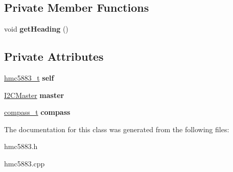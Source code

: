 \subsection*{Private Member Functions}
\begin{DoxyCompactItemize}
\item 
\mbox{\label{classHmc5883_ad4af7af089cc97b70cd75f705773e509}} 
void {\bfseries get\+Heading} ()
\end{DoxyCompactItemize}
\subsection*{Private Attributes}
\begin{DoxyCompactItemize}
\item 
\mbox{\label{classHmc5883_a7864e224789881243d69cefce89d7918}} 
\mbox{\hyperlink{structhmc5883__t}{hmc5883\+\_\+t}} {\bfseries self}
\item 
\mbox{\label{classHmc5883_a8c46d4fe172002c5020423939d2e98d1}} 
\mbox{\hyperlink{classI2CMaster}{I2\+C\+Master}} {\bfseries master}
\item 
\mbox{\label{classHmc5883_a3db3c0edeb0859b84b4530f935bc75b1}} 
\mbox{\hyperlink{structcompass__t}{compass\+\_\+t}} {\bfseries compass}
\end{DoxyCompactItemize}


The documentation for this class was generated from the following files\+:\begin{DoxyCompactItemize}
\item 
hmc5883.\+h\item 
hmc5883.\+cpp\end{DoxyCompactItemize}
